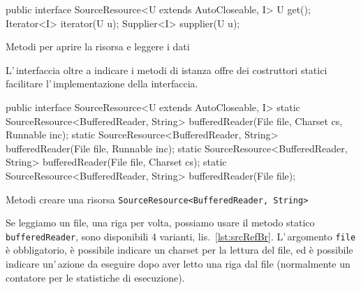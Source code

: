 \begin{elisting}[!htb]
    \begin{javacode}
        public interface SourceResource<U extends AutoCloseable, I> {
    U get();
    Iterator<I> iterator(U u);
    Supplier<I> supplier(U u);
}
    \end{javacode}
    \caption{Metodi per aprire la risorsa e leggere i dati}
    \label{lst:srcRef}
\end{elisting}

L'\,interfaccia oltre a indicare i metodi di istanza offre dei costruttori
statici facilitare l'\,implementazione della interfaccia.

\begin{elisting}[!htb]
    \begin{javacode}
        public interface SourceResource<U extends AutoCloseable, I> {
    static SourceResource<BufferedReader, String> bufferedReader(File file, Charset cs, Runnable inc);
    static SourceResource<BufferedReader, String> bufferedReader(File file, Runnable inc);
    static SourceResource<BufferedReader, String> bufferedReader(File file, Charset cs);
    static SourceResource<BufferedReader, String> bufferedReader(File file);
}
    \end{javacode}
    \caption{Metodi creare una risorsa \texttt{SourceResource<BufferedReader, String>}}
    \label{lst:srcRefBr}
\end{elisting}
Se leggiamo un file, una riga per volta, possiamo usare il metodo statico
\texttt{bufferedReader}, sono disponibili 4 varianti, lis.~\ref{lst:srcRefBr}.
L'\,argomento \texttt{file} è obbligatorio, è possibile indicare un charset per
la lettura del file, ed è possibile indicare un'\,azione da eseguire dopo aver
letto una riga dal file (normalmente un contatore per le statistiche di
esecuzione).

